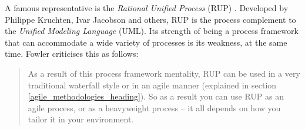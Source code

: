 A famous representative is the \emph{Rational Unified Process} (RUP) \cite{rup}.
Developed by Philippe Kruchten, Ivar Jacobson and others, RUP is the process
complement to the \emph{Unified Modeling Language} (UML). Its strength of being
a process framework that can accommodate a wide variety of processes is its
weakness, at the same time. Fowler \cite{fowlernewmethodology} criticises this
as follows:

\begin{quote}
    As a result of this process framework mentality, RUP can be used in a very
    traditional waterfall style or in an agile manner (explained in section
    \ref{agile_methodologies_heading}). So as a result you can use RUP as an
    agile process, or as a heavyweight process -- it all depends on how you
    tailor it in your environment.
\end{quote}
